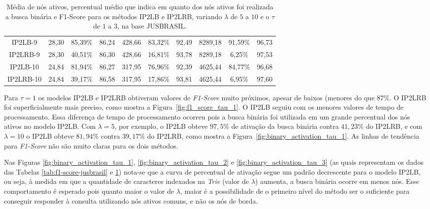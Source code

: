 \begin{table}[]
{\begin{tabular}{c|ccc|ccc|ccc|}
\multicolumn{1}{|c|}{IP2LB-9} & 28,30 & 85,39\% & 86,24 & 428,66 & 83,32\% & 92,49 & 8289,18 & 91,59\% & 96,73 \\
\multicolumn{1}{|c|}{IP2LRB-9} & 28,30 & 40,51\% & 86,30 & 428,66 & 16,81\% & 93,78 & 8289,18 & 6,25\% & 97,53 \\ \hline
\multicolumn{1}{|c|}{IP2LB-10} & 24,84 & 81,94\% & 86,27 & 317,95 & 76,96\% & 92,39 & 4625,44 & 84,77\% & 96,68 \\
\multicolumn{1}{|c|}{IP2LRB-10} & 24,84 & 39,17\% & 86,58 & 317,95 & 17,86\% & 93,81 & 4625,44 & 6,95\% & 97,60 \\ \hline
\end{tabular}%
}
\caption{Média de nós ativos, percentual médio que indica em quanto dos nós ativos foi realizada a busca binária e F1-Score para os métodos IP2LB e IP2LRB, variando $\lambda$ de $5$ a $10$ e o $\tau$ de $1$ a $3$, na base JUSBRASIL.}
\label{tab:binary-search-activation}
\end{table}

Para $\tau=1$ os modelos IP2LB e IP2LRB obtiveram valores de \textit{F1-Score} muito próximos, apesar de baixos (menores do que $87\%$. O IP2LRB foi superficialmente mais preciso, como mostra a Figura~\ref{fig:f1_score_tau_1}. O IP2LB seguiu com os menores valores de tempo de processamento. Essa diferença de tempo de processamento ocorreu pois a busca binária foi utilizada em um grande percentual dos nós ativos no modelo IP2LB. Com $\lambda=5$, por exemplo, o IP2LB obteve $97,5\%$ de ativação da busca binária contra $41,23\%$ do IP2LRB, e com $\lambda=10$ o IP2LB obteve $81,94\%$ contra $39,17\%$ do IP2LRB, como mostra a Figura~\ref{fig:binary_activation_tau_1}. As linhas de tendência para \textit{F1-Score} não são muito claras para os dois métodos. 

Nas Figuras \ref{fig:binary_activation_tau_1}, \ref{fig:binary_activation_tau_2} e \ref{fig:binary_activation_tau_3} (as quais representam os dados das Tabelas \ref{tab:f1-score-jusbrasil} e \ref{tab:binary-search-activation}) nota-se que a curva de percentual de ativação segue um padrão decrescente para o modelo IP2LB, ou seja, à medida em que a quantidade de caracteres indexados na \textit{Trie} (valor de $\lambda$) aumenta, a busca binária ocorre em menos nós. Esse comportamento é esperado pois quanto maior o valor de $\lambda$, maior é a possibilidade de o primeiro nível do método ser o suficiente para conseguir responder à consulta utilizando nós ativos comuns, e não os nós de borda. 

